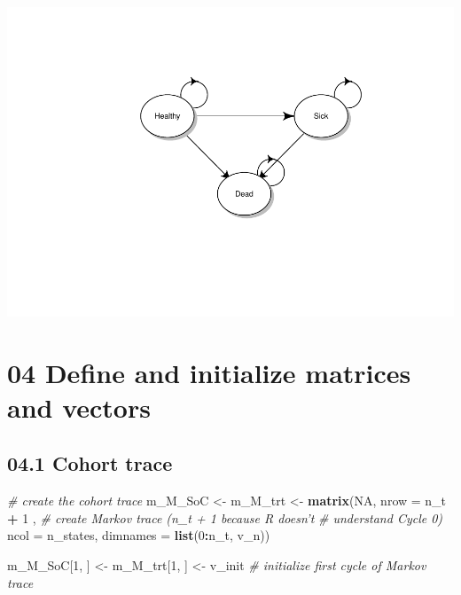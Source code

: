 \documentclass[
]{article}
\newenvironment{Shaded}{\begin{snugshade}}{\end{snugshade}}
\newcommand{\CommentTok}[1]{\textcolor[rgb]{0.56,0.35,0.01}{\textit{#1}}}
\newcommand{\DataTypeTok}[1]{\textcolor[rgb]{0.13,0.29,0.53}{#1}}
\newcommand{\DecValTok}[1]{\textcolor[rgb]{0.00,0.00,0.81}{#1}}
\newcommand{\KeywordTok}[1]{\textcolor[rgb]{0.13,0.29,0.53}{\textbf{#1}}}
\newcommand{\NormalTok}[1]{#1}
\newcommand{\OperatorTok}[1]{\textcolor[rgb]{0.81,0.36,0.00}{\textbf{#1}}}
\newcommand{\OtherTok}[1]{\textcolor[rgb]{0.56,0.35,0.01}{#1}}
\newcommand{\StringTok}[1]{\textcolor[rgb]{0.31,0.60,0.02}{#1}}
\begin{document}
\includegraphics{Markov_3state_hesim_files/figure-latex/unnamed-chunk-5-1.pdf}

\hypertarget{define-and-initialize-matrices-and-vectors}{%
\section{04 Define and initialize matrices and
vectors}\label{define-and-initialize-matrices-and-vectors}}

\hypertarget{cohort-trace}{%
\subsection{04.1 Cohort trace}\label{cohort-trace}}

\begin{Shaded}
\begin{Highlighting}[]
\CommentTok{# create the cohort trace}
\NormalTok{m_M_SoC <-}\StringTok{ }\NormalTok{m_M_trt <-}\StringTok{  }\KeywordTok{matrix}\NormalTok{(}\OtherTok{NA}\NormalTok{, }
                              \DataTypeTok{nrow =}\NormalTok{ n_t }\OperatorTok{+}\StringTok{ }\DecValTok{1}\NormalTok{ ,  }\CommentTok{# create Markov trace (n_t + 1 because R doesn't }
                                                \CommentTok{# understand Cycle 0)}
                              \DataTypeTok{ncol =}\NormalTok{ n_states, }
                              \DataTypeTok{dimnames =} \KeywordTok{list}\NormalTok{(}\DecValTok{0}\OperatorTok{:}\NormalTok{n_t, v_n))}

\NormalTok{m_M_SoC[}\DecValTok{1}\NormalTok{, ] <-}\StringTok{ }\NormalTok{m_M_trt[}\DecValTok{1}\NormalTok{, ] <-}\StringTok{ }\NormalTok{v_init          }\CommentTok{# initialize first cycle of Markov trace}
\end{Highlighting}
\end{Shaded}
\end{document}
